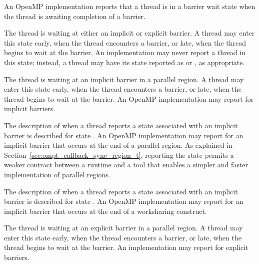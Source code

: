 
An OpenMP implementation reports that a thread is in a barrier wait state
when the thread is awaiting completion of a barrier.


\begin{description}

  \item {}

  \sloppy
  The thread is waiting at either an implicit or explicit barrier.
  A thread may enter this state
  early, when the thread encounters a barrier, or late, when the
  thread begins to wait at the barrier. An implementation may never report a thread in this state; instead, a thread may have its state reported
  as   or , as appropriate.

  \item {}

  \sloppy
  The thread is waiting at an implicit barrier in a parallel region.
  A  thread may enter this state
  early, when the thread encounters a barrier, or late, when the
  thread begins to wait at the barrier.
  An OpenMP implementation may report 
  for implicit barriers.

  \item {}

  The description of when a thread reports a state associated with an implicit barrier
  is described for state .
  An OpenMP implementation may report 
  for an implicit barrier that occurs at the end of a parallel region.
  As explained in Section~\ref{sec:ompt_callback_sync_region_t},
  reporting the state 
  permits a weaker contract between a runtime and a tool that
  enables a simpler and faster implementation of parallel regions.

  \item {}

  The description of when a thread reports a state associated with an implicit barrier
  is described for state .
  An OpenMP implementation may report 
  for an implicit barrier that occurs at the end of a worksharing construct.

  \item {}

  The thread is waiting at an explicit barrier  in a parallel region.
  A thread may enter this state
  early, when the thread encounters a barrier, or late, when the
  thread begins to wait at the barrier.
  An implementation may report 
  for explicit barriers.


\end{description}

